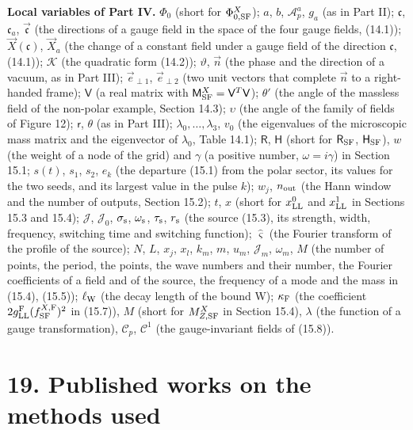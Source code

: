 \documentclass[
  10pt,
]{article}
\begin{document}
\textbf{Local variables of Part IV.} \(\Phi_0\) (short for
\(\Phi^X_{0,{\rm SF}}\)); \(a\), \(b\), \(\mathcal A^a_p\), \(g_a\) (as
in Part II); \(\mathfrak c\), \(\mathfrak c_a\), \(\vec{\mathfrak c}\)
(the directions of a gauge field in the space of the four gauge fields,
(14.1)); \(\vec X(\mathfrak c)\), \(\vec X_a\) (the change of a constant
field under a gauge field of the direction \(\mathfrak c\), (14.1));
\(\mathcal K\) (the quadratic form (14.2)); \(\vartheta\), \(\vec n\)
(the phase and the direction of a vacuum, as in Part III);
\(\vec e_{\perp1}\), \(\vec e_{\perp2}\) (two unit vectors that complete
\(\vec n\) to a right-handed frame); \(\mathsf V\) (a real matrix with
\(\mathsf M^X_{\rm SF}=\mathsf V^T\mathsf V\)); \(\theta'\) (the angle
of the massless field of the non-polar example, Section 14.3);
\(\upsilon\) (the angle of the family of fields of Figure 12);
\(\mathsf r\), \(\theta\) (as in Part III);
\(\lambda_0,\dots,\lambda_3\), \(v_0\) (the eigenvalues of the
microscopic mass matrix and the eigenvector of \(\lambda_0\), Table
14.1); \(\mathsf R\), \(\mathsf H\) (short for \(\mathsf R_{\rm SF}\),
\(\mathsf H_{\rm SF}\)), \(w\) (the weight of a node of the grid) and
\(\gamma\) (a positive number, \(\omega=i\gamma\)) in Section 15.1;
\(s(t)\), \(s_1\), \(s_2\), \(e_k\) (the departure (15.1) from the polar
sector, its values for the two seeds, and its largest value in the pulse
\(k\)); \(w_j\), \(n_{\rm out}\) (the Hann window and the number of
outputs, Section 15.2); \(t\), \(x\) (short for \(x^0_{\rm LL}\) and
\(x^1_{\rm LL}\) in Sections 15.3 and 15.4); \(\mathcal J\),
\(\mathcal J_0\), \(\sigma_{\rm s}\), \(\omega_{\rm s}\),
\(\tau_{\rm s}\), \(r_{\rm s}\) (the source (15.3), its strength, width,
frequency, switching time and switching function); \(\hat\varsigma\)
(the Fourier transform of the profile of the source); \(N\), \(L\),
\(x_j\), \(x_l\), \(k_m\), \(m\), \(u_m\), \(\mathcal J_m\),
\(\omega_m\), \(M\) (the number of points, the period, the points, the
wave numbers and their number, the Fourier coefficients of a field and
of the source, the frequency of a mode and the mass in (15.4), (15.5));
\(\ell_{\rm W}\) (the decay length of the bound W); \(\kappa_{\rm F}\)
(the coefficient \(2g^{\rm F}_{\rm LL}(f^{X,{\rm F}}_{\rm SF})^2\) in
(15.7)), \(M\) (short for \(M^X_{Z,{\rm SF}}\) in Section 15.4),
\(\lambda\) (the function of a gauge transformation), \(\mathcal C_p\),
\(\mathcal C^1\) (the gauge-invariant fields of (15.8)).

\hypertarget{published-works-on-the-methods-used}{%
\section{19. Published works on the methods
used}\label{published-works-on-the-methods-used}}
\end{document}

